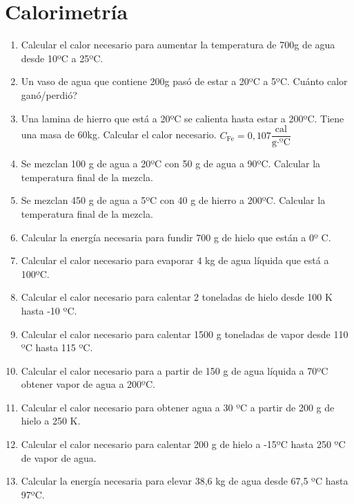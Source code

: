 \section{Calorimetría}

\begin{enumerate}
\item Calcular el calor necesario para aumentar la temperatura de 700g de agua desde 10ºC a 25ºC.

\item Un vaso de agua que contiene 200g pasó de estar a 20ºC a 5ºC. Cuánto calor ganó/perdió?

\item Una lamina de hierro que está a 20ºC se calienta hasta estar a 200ºC. Tiene una masa de 60kg. Calcular el calor necesario. $C_{\text{Fe}}=0,107 \dfrac{\text{cal}}{\text{g} \cdot \text{ºC}}$

\item Se mezclan 100 g de agua a 20ºC con 50 g de agua a 90ºC. Calcular la temperatura final de la mezcla.

\item Se mezclan 450 g de agua a 5ºC con 40 g de hierro a 200ºC. Calcular la temperatura final de la mezcla.

\item Calcular la energía necesaria para fundir 700 g de hielo que están a 0º C.

\item Calcular el calor necesario para evaporar 4 kg de agua líquida que está a 100ºC.

\item Calcular el calor necesario para calentar 2 toneladas de hielo desde 100 K hasta -10 ºC.

\item Calcular el calor necesario para calentar 1500 g toneladas de vapor desde 110 ºC hasta 115 ºC.

\item Calcular el calor necesario para a partir de 150 g de agua líquida a 70ºC obtener vapor de agua a 200ºC.

\item Calcular el calor necesario para obtener agua a 30 ºC a partir de 200 g de hielo a 250 K.

\item Calcular el calor necesario para calentar 200 g de hielo a -15ºC hasta 250 ºC de vapor de agua.

\item Calcular la energía necesaria para elevar 38,6 kg de agua desde 67,5 ºC hasta 97ºC.


\end{enumerate}
